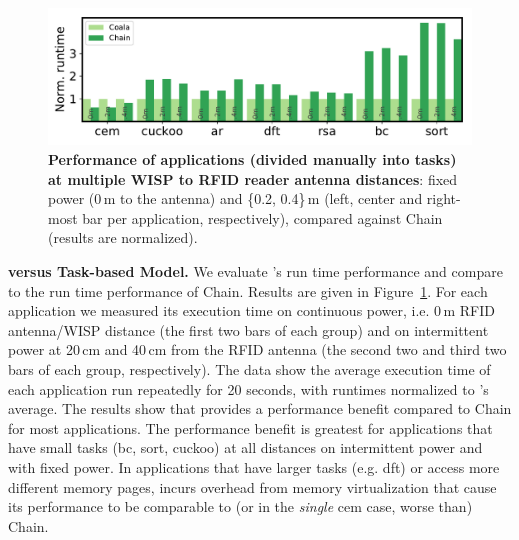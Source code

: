 \begin{figure}
	\centering
	\includegraphics[width=\columnwidth]{figures/coala_chain_clang}
	\caption{\textbf{Performance of \sys applications (divided manually into tasks) at multiple WISP to RFID reader antenna distances}: fixed power (0\,m to the antenna) and \{0.2, 0.4\}\,m (left, center and right-most bar per application, respectively), compared against Chain (results are normalized).}
	\label{fig:runtime}
\end{figure}

\textbf{\sys versus Task-based Model.} We evaluate \sys's run time performance and compare \sys to the run time performance of Chain. Results are given in Figure~\ref{fig:runtime}. For each application we measured its execution time on continuous power, i.e. 0\,m RFID antenna/WISP distance (the first two bars of each group) and on intermittent power at 20\,cm and 40\,cm from the RFID antenna (the second two and third two bars of each group, respectively). The data show the average execution time of each application run repeatedly for 20 seconds, with runtimes normalized to \sys's average. The results show that \sys provides a performance benefit compared to Chain for most applications. The performance benefit is greatest for applications that have small tasks (bc, sort, cuckoo) at all distances on intermittent power and with fixed power. In applications that have larger tasks (e.g. dft) or access more different memory pages, \sys incurs overhead from memory virtualization that cause its performance to be comparable to (or in the \emph{single} cem case, worse than) Chain. 

